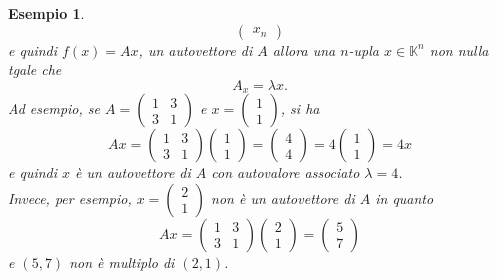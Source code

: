 \documentclass{book}
\newtheorem{esempio}{Esempio}[section]
\begin{document}
\begin{esempio}
\begin{equation}
\begin{pmatrix}
      x_n
    \end{pmatrix} 
  \end{equation}
  e quindi $f(x)=Ax$, un autovettore di $A$ allora una $n$-upla $x\in \mathds{K}^n$ non nulla tgale che
  \begin{equation}
    \label{eq:5.4}
    A_x=\lambda x.
  \end{equation}
  Ad esempio, se $A=
  \begin{pmatrix}
    1 & 3\\
    3 & 1
  \end{pmatrix}
  $ e $x =
  \begin{pmatrix}
    1 \\
    1
  \end{pmatrix}
  $, si ha
  \begin{equation*}
    Ax=
    \begin{pmatrix}      
        1 & 3\\
        3 & 1
   \end{pmatrix}
   \begin{pmatrix}
    1 \\
    1
  \end{pmatrix}
  =
  \begin{pmatrix}
    4\\
    4
  \end{pmatrix}
  =4
  \begin{pmatrix}
    1\\
    1
  \end{pmatrix}=4x
\end{equation*}
e quindi $x$ è un autovettore di $A$ con autovalore associato $\lambda=4$.\\
Invece, per esempio, $x=
\begin{pmatrix}
  2\\
  1
\end{pmatrix}
$ non è un autovettore di $A$ in quanto
\begin{equation*}
  Ax=\begin{pmatrix}
       1 & 3\\
       3 & 1
  \end{pmatrix}
  \begin{pmatrix}
    2 \\
    1
  \end{pmatrix}=
  \begin{pmatrix}
    5 \\
    7
  \end{pmatrix}
\end{equation*}
e $(5,7)$ non è multiplo di $(2,1)$.
\end{esempio}
\end{document}

